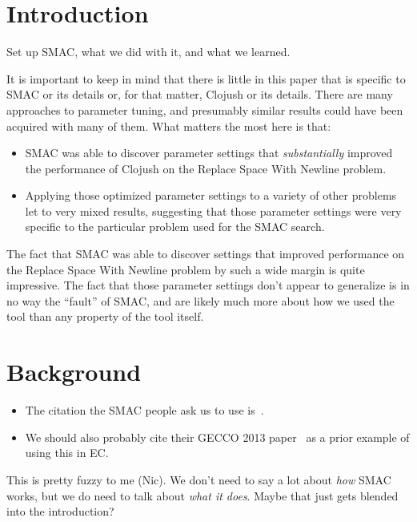\section{Introduction}
\label{sec:introduction}

Set up SMAC, what we did with it, and what we learned.

It is important to keep in mind that there is little in this paper that is
specific to SMAC or its details or, for that matter, Clojush or its details. 
There are many approaches to parameter
tuning, and presumably similar results could have been acquired with many of
them. What matters the most here is that:
\begin{itemize}
	\item SMAC was able to discover parameter settings that 
	\emph{substantially} improved the performance
	of Clojush on the Replace Space With Newline problem.
	\item Applying those optimized parameter settings to a variety of other
	problems let to very mixed results, suggesting that those parameter
	settings were very specific to the particular problem used for the SMAC
	search.
\end{itemize}
The fact that SMAC was able to discover settings that improved
performance on the Replace Space With Newline problem by such a wide margin
is quite impressive. The fact that those parameter settings don't appear to
generalize is in no way the ``fault'' of SMAC, and are likely much more 
about how we used the tool than any property of the tool itself.

\section{Background}
\label{sec:background}

\begin{itemize}
	\item The citation the SMAC people ask us to use is~\cite{HutHooLey11-SMAC}.
	\item We should also probably cite their GECCO 2013 
	paper~\cite{hutter2013evaluation} as a prior example of using this in EC.
\end{itemize}

This is pretty fuzzy to me (Nic). We don't need to say a lot about \emph{how}
SMAC works, but we do need to talk about \emph{what it does}. Maybe that just
gets blended into the introduction?

